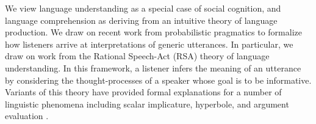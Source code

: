\documentclass[10pt,letterpaper]{article}
\begin{document}
We view language understanding as a special case of social cognition, and language comprehension as deriving from an intuitive theory of language production.  We draw on recent work from probabilistic pragmatics to formalize how listeners arrive at interpretations of generic utterances. In particular, we draw on work from the Rational Speech-Act (RSA) theory of language understanding. In this framework, a listener infers the meaning of an utterance by considering the thought-processes of a speaker whose goal is to be informative. Variants of this theory have provided formal explanations for a number of linguistic phenomena including scalar implicature, hyperbole, and argument evaluation \cite{Kao2014, Tessler2014, Lassiter2014}. 




\end{document}
